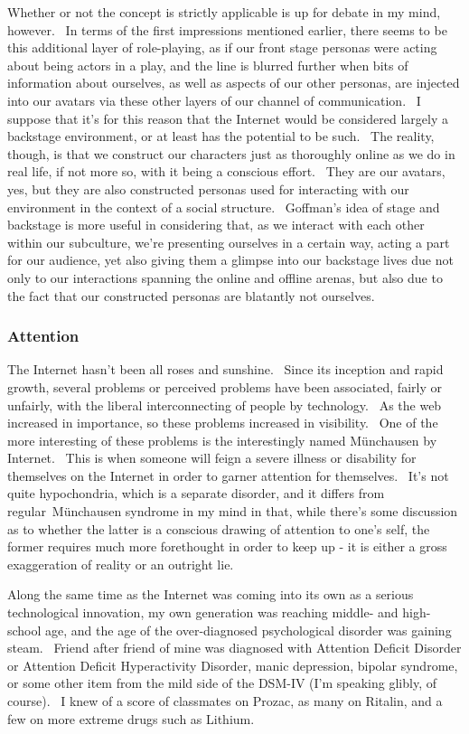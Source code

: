 Whether or not the concept is strictly applicable is up for debate in my
mind, however. ~In terms of the first impressions mentioned earlier,
there seems to be this additional layer of role-playing, as if our front
stage personas were acting about being actors in a play, and the line is
blurred further when bits of information about ourselves, as well as
aspects of our other personas, are injected into our avatars via these
other layers of our channel of communication. ~I suppose that it's for
this reason that the Internet would be considered largely a backstage
environment, or at least has the potential to be such. ~The reality,
though, is that we construct our characters just as thoroughly online as
we do in real life, if not more so, with it being a conscious effort.
~They are our avatars, yes, but they are also constructed personas used
for interacting with our environment in the context of a social
structure. ~Goffman's idea of stage and backstage is more useful in
considering that, as we interact with each other within our subculture,
we're presenting ourselves in a certain way, acting a part for our
audience, yet also giving them a glimpse into our backstage lives due
not only to our interactions spanning the online and offline arenas, but
also due to the fact that our constructed personas are blatantly not
ourselves.

\subsubsection{Attention}\label{attention}

The Internet hasn't been all roses and sunshine. ~Since its inception
and rapid growth, several problems or perceived problems have been
associated, fairly or unfairly, with the liberal interconnecting of
people by technology. ~As the web increased in importance, so these
problems increased in visibility. ~One of the more interesting of these
problems is the interestingly named Münchausen by Internet. ~This is
when someone will feign a severe illness or disability for themselves on
the Internet in order to garner attention for themselves. ~It's not
quite hypochondria, which is a separate disorder, and it differs from
regular~Münchausen syndrome in my mind in that, while there's some
discussion as to whether the latter is a conscious drawing of attention
to one's self, the former requires much more forethought in order to
keep up - it is either a gross exaggeration of reality or an outright
lie.

Along the same time as the Internet was coming into its own as a serious
technological innovation, my own generation was reaching middle- and
high-school age, and the age of the over-diagnosed psychological
disorder was gaining steam. ~Friend after friend of mine was diagnosed
with Attention Deficit Disorder or Attention Deficit Hyperactivity
Disorder, manic depression, bipolar syndrome, or some other item from
the mild side of the DSM-IV (I'm speaking glibly, of course). ~I knew of
a score of classmates on Prozac, as many on Ritalin, and a few on more
extreme drugs such as Lithium.

